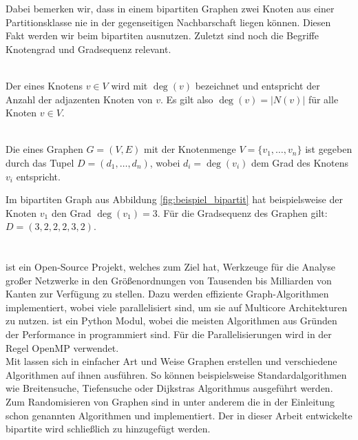 Dabei bemerken wir, dass in einem bipartiten Graphen zwei Knoten aus einer Partitionsklasse nie
in der gegenseitigen Nachbarschaft liegen können. Diesen Fakt werden wir beim bipartiten \gc{} ausnutzen.
Zuletzt sind noch die Begriffe Knotengrad und Gradsequenz relevant.
\begin{definition}[Knotengrad]~\\
Der  eines Knotens $v \in V$ wird mit $\deg(v)$ bezeichnet und entspricht der Anzahl
der adjazenten Knoten von $v$. Es gilt also $\deg(v) = |N(v)|$ für alle Knoten $v\in V.$
\end{definition}
\begin{definition}[Gradsequenz]~\\
Die  eines Graphen $G = (V,E)$ mit der Knotenmenge $V = \{v_{1},\dots, v_{n}\}$ ist gegeben durch das Tupel
$D = (d_{1}, \dots, d_{n})$, wobei $d_{i} = \deg(v_{i})$ dem Grad des Knotens $v_{i}$ entspricht.
\end{definition}

Im bipartiten Graph aus Abbildung \ref{fig:beispiel_bipartit} hat beispielsweise
der Knoten $v_{1}$ den Grad $\deg(v_{1}) = 3$. Für die Gradsequenz des Graphen gilt: 
$D = (3,2,2,2,3,2)$.




\section{\nk}

\nk{} \cite{nk} ist ein Open-Source Projekt, welches  zum Ziel hat, Werkzeuge für die
Analyse großer Netzwerke in den Größenordnungen von Tausenden bis Milliarden 
von Kanten zur Verfügung zu stellen.
Dazu werden effiziente Graph-Algorithmen implementiert, wobei viele parallelisiert
sind, um sie auf Multicore Architekturen zu nutzen\cite{nk_page}.
\nk{} ist ein Python Modul, wobei die meisten Algorithmen aus Gründen
der Performance in \cpp programmiert sind. Für die Parallelisierungen wird in der Regel OpenMP\cite{openmp} verwendet.
\\

Mit \nk{} lassen sich in einfacher Art und Weise Graphen erstellen  und verschiedene
Algorithmen auf ihnen ausführen. So können beispielsweise Standardalgorithmen
wie Breitensuche, Tiefensuche oder Dijkstras Algorithmus ausgeführt werden. 
Zum Randomisieren von Graphen sind in \nk{} unter anderem die in der Einleitung schon genannten 
Algorithmen \cb{} und \gc{} implementiert.
Der in dieser Arbeit entwickelte bipartite \gc{} wird schließlich zu \nk{} hinzugefügt werden.


